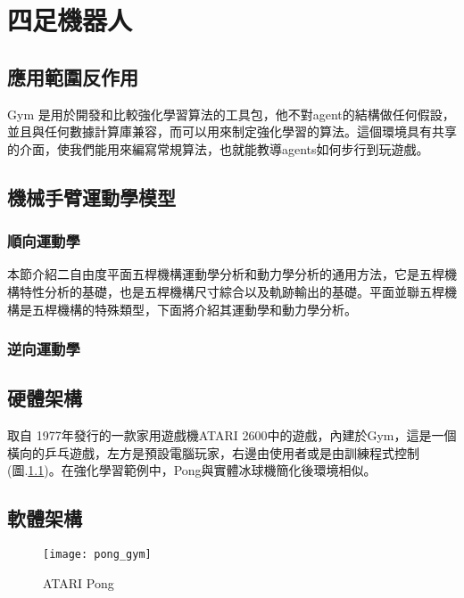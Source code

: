 \chapter{四足機器人}
\section{應用範圍反作用}
 Gym 是用於開發和比較強化學習算法的工具包，他不對agent的結構做任何假設，並且與任何數據計算庫兼容，而可以用來制定強化學習的算法。這個環境具有共享的介面，使我們能用來編寫常規算法，也就能教導agents如何步行到玩遊戲。\\[6pt]

\section{機械手臂運動學模型}
\subsection{順向運動學}
本節介紹二自由度平面五桿機構運動學分析和動力學分析的通用方法，它是五桿機構特性分析的基礎，也是五桿機構尺寸綜合以及軌跡輸出的基礎。平面並聯五桿機構是五桿機構的特殊類型，下面將介紹其運動學和動力學分析。\

\subsection{逆向運動學}

\section{硬體架構}
 取自 1977年發行的一款家用遊戲機ATARI 2600中的遊戲，內建於Gym，這是一個橫向的乒乓遊戲，左方是預設電腦玩家，右邊由使用者或是由訓練程式控制(圖.\ref{fig.pong})。在強化學習範例中，Pong與實體冰球機簡化後環境相似。\\
 
 \section{軟體架構}
\begin{figure}[hbt!]
\begin{center}
\texttt{[image: pong\_gym]}
\caption{\Large ATARI Pong}\label{fig.pong}
\end{center}
\end{figure} 

\newpage
